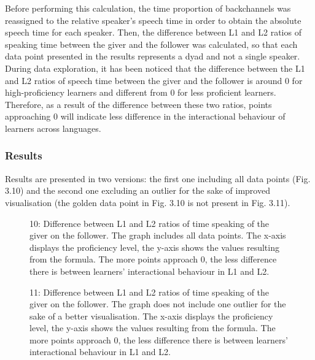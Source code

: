 Before performing this calculation, the time proportion of backchannels was reassigned to the relative speaker’s speech time in order to obtain the absolute speech time for each speaker. Then, the difference between L1 and L2 ratios of speaking time between the giver and the follower was calculated, so that each data point presented in the results represents a dyad and not a single speaker. During data exploration, it has been noticed that the difference between the L1 and L2 ratios of speech time between the giver and the follower is around 0 for high-proficiency learners and different from 0 for less proficient learners. Therefore, as a result of the difference between these two ratios, points approaching 0 will indicate less difference in the interactional behaviour of learners across languages.

\subsubsection{Results}
\hypertarget{Toc191305938}{}
Results are presented in two versions: the first one including all data points (Fig. 3.10) and the second one excluding an outlier for the sake of improved visualisation (the golden data point in Fig. 3.10 is not present in Fig. 3.11).

  
 

\begin{stylecaption}\begin{figure}
\caption{10: Difference between L1 and L2 ratios of time speaking of the giver on the follower. The graph includes all data points. The x-axis displays the proficiency level, the y-axis shows the values resulting from the formula. The more points approach 0, the less difference there is between learners’ interactional behaviour in L1 and L2.}
\label{fig:key:3}
\end{figure}\end{stylecaption}

  
 

\begin{stylecaption}\begin{figure}
\caption{11: Difference between L1 and L2 ratios of time speaking of the giver on the follower. The graph does not include one outlier for the sake of a better visualisation. The x-axis displays the proficiency level, the y-axis shows the values resulting from the formula. The more points approach 0, the less difference there is between learners’ interactional behaviour in L1 and L2.}
\label{fig:key:3}
\end{figure}\end{stylecaption}

